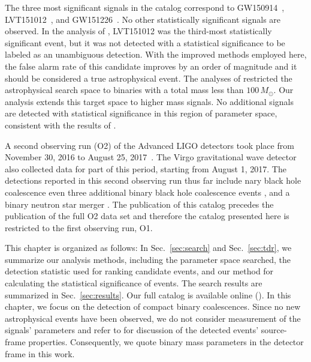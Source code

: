 The three most significant signals in the catalog correspond to GW150914~\citep{Abbott:2016blz}, LVT151012~\citep{Abbott:2016blz,TheLIGOScientific:2016pea}, and GW151226~\citep{Abbott:2016nmj}. No other statistically significant signals are observed. In the analysis of \cite{TheLIGOScientific:2016pea}, LVT151012 was the third-most statistically significant event, but it was not detected with a statistical significance to be labeled as an unambiguous detection. With the improved methods employed here, the false alarm rate of this candidate improves by an order of magnitude and it should be considered a true astrophysical event. The analyses of \cite{TheLIGOScientific:2016pea,Abbott:2016ymx} restricted the astrophysical search space to binaries with a total mass less than $100\,M_\odot$. Our analysis extends this target space to higher mass signals. No additional signals are detected with statistical significance in this region of parameter space, consistent with the results of \cite{Abbott:2017iws}. 

A second observing run (O2) of the Advanced LIGO detectors took place from November 30, 2016 to August 25, 2017~\citep{Aasi:2013wya}.  The Virgo gravitational wave detector also collected data for part of this period, starting from August 1, 2017.  The detections reported in this second observing run thus far include nary black hole coalescence even three additional binary black hole coalescence events \citep{Abbott:2017vtc,Abbott:2017gyy,Abbott:2017oio}, and a binary neutron star merger \citep{TheLIGOScientific:2017qsa}. The publication of this catalog precedes the publication of the full O2 data set and therefore the catalog presented here is restricted to the first observing run, O1.

This chapter is organized as follows: In Sec.~\ref{sec:search} and Sec.~\ref{sec:tdr}, we summarize our analysis methods, including the parameter space searched, the detection statistic used for ranking candidate events, and our method for calculating the statistical significance of events. The search results are summarized in Sec.~\ref{sec:results}.  Our full catalog 
is available online (\release). In this chapter, we focus on the detection of compact binary coalescences. Since no new astrophysical events have been observed, we do not consider measurement of the signals' parameters and refer to \cite{TheLIGOScientific:2016pea,Biwer:2018osg} for discussion of the detected events' source-frame properties. Consequently, we quote binary mass parameters in the detector frame in this work.

